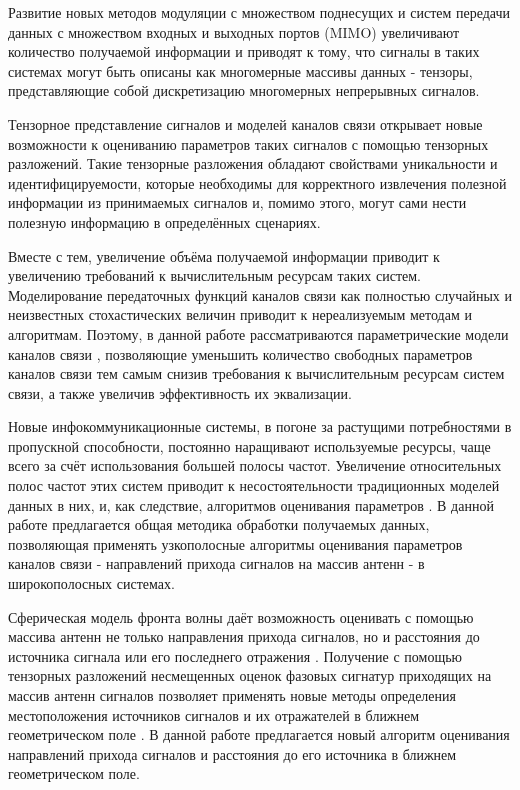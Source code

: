 
{\actuality} Развитие новых методов модуляции с множеством поднесущих и систем передачи данных с множеством входных и выходных портов (MIMO) увеличивают количество получаемой информации и приводят к тому, что сигналы в таких системах могут быть описаны как многомерные массивы данных - тензоры, представляющие собой дискретизацию многомерных непрерывных сигналов.

Тензорное представление сигналов и моделей каналов связи открывает новые возможности к оцениванию параметров таких сигналов с помощью тензорных разложений. Такие тензорные разложения обладают свойствами уникальности и идентифицируемости, которые необходимы для корректного извлечения полезной информации из принимаемых сигналов и, помимо этого, могут сами нести полезную информацию в определённых сценариях.

Вместе с тем, увеличение объёма получаемой информации приводит к увеличению требований к вычислительным ресурсам таких систем. Моделирование передаточных функций каналов связи как полностью случайных и неизвестных стохастических величин приводит к нереализуемым методам и алгоритмам. Поэтому, в данной работе рассматриваются параметрические модели каналов связи \cite{Richter2005}, позволяющие уменьшить количество свободных параметров каналов связи тем самым снизив требования к вычислительным ресурсам систем связи, а также увеличив эффективность их эквализации.

Новые инфокоммуникационные системы, в погоне за растущими потребностями в пропускной способности, постоянно наращивают используемые ресурсы, чаще всего за счёт использования большей полосы частот. Увеличение относительных полос частот этих систем приводит к несостоятельности традиционных моделей данных в них, и, как следствие, алгоритмов оценивания параметров \cite{DoHong2004, Raimondi2016}. В данной работе предлагается общая методика обработки получаемых данных, позволяющая применять узкополосные алгоритмы оценивания параметров каналов связи - направлений прихода сигналов на массив антенн - в широкополосных системах.

Сферическая модель фронта волны даёт возможность оценивать с помощью массива антенн не только направления прихода сигналов, но и расстояния до источника сигнала или его последнего отражения \cite{Singh2017a, Singh2017}. Получение с помощью тензорных разложений несмещенных оценок фазовых сигнатур приходящих на массив антенн сигналов позволяет применять новые методы определения местоположения источников сигналов и их отражателей в ближнем геометрическом поле \cite{Singh2016}. В данной работе предлагается новый алгоритм оценивания направлений прихода сигналов и расстояния до его источника в ближнем геометрическом поле.

